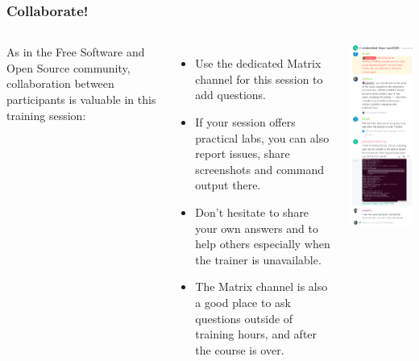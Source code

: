 \begin{frame}
\frametitle{Collaborate!}
\begin{columns}
  As in the Free Software and Open Source community,
  collaboration between participants is valuable in this training session:
  \begin{itemize}
    \item Use the dedicated Matrix channel for this session
	  to add questions.
    \item If your session offers practical labs, you can also
          report issues, share screenshots and command output there.
    \item Don't hesitate to share your own answers and to help others
          especially when the trainer is unavailable.
    \item The Matrix channel is also a good place to ask questions
	  outside of training hours, and after the course is over.
    \end{itemize}
  \includegraphics[height=0.8\textheight]{slides/course-information/matrix-screenshot.png}
\end{columns}
\end{frame}
